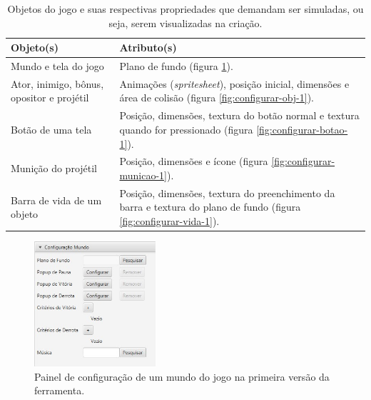 \documentclass[12pt,twoside,openright,a4paper,english,brazil,sumario=tradicional]{abntex2}
\begin{document}
\begin{table}[h]
   \centering
   \begin{tabular}{| p{6cm} | p{9cm} |}
      \hline
      \textbf{Objeto(s)} & \textbf{Atributo(s)} \\
      \hline
      Mundo e tela do jogo & Plano de fundo (figura \ref{fig:configurar-mundo-1}).\\
      \hline
      Ator, inimigo, bônus, opositor e projétil & Animações (\emph{spritesheet}), posição inicial, dimensões e área de colisão (figura \ref{fig:configurar-obj-1}). \\
      \hline
      Botão de uma tela & Posição, dimensões, textura do botão normal e textura quando for pressionado (figura \ref{fig:configurar-botao-1}).\\
      \hline
      Munição do projétil & Posição, dimensões e ícone (figura \ref{fig:configurar-municao-1}). \\
      \hline
      Barra de vida de um objeto & Posição, dimensões, textura do preenchimento da barra e textura do plano de fundo (figura \ref{fig:configurar-vida-1}). \\
      \hline
   \end{tabular}
   \caption{Objetos do jogo e suas respectivas propriedades que demandam ser simuladas, ou seja, serem visualizadas na criação.}
   \label{table:objetos-atributos}
\end{table}
\begin{figure}[h]
\centering
\includegraphics[width=0.4\textwidth]{images/configurar-mundo-1.jpg}
\caption{Painel de configuração de um mundo do jogo na primeira versão da ferramenta.}
\label{fig:configurar-mundo-1}
\end{figure}
\end{document}
